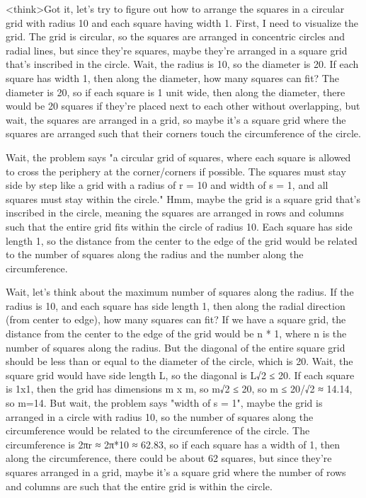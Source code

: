 <think>Got it, let's try to figure out how to arrange the squares in a circular grid with radius 10 and each square having width 1. First, I need to visualize the grid. The grid is circular, so the squares are arranged in concentric circles and radial lines, but since they're squares, maybe they're arranged in a square grid that's inscribed in the circle. Wait, the radius is 10, so the diameter is 20. If each square has width 1, then along the diameter, how many squares can fit? The diameter is 20, so if each square is 1 unit wide, then along the diameter, there would be 20 squares if they're placed next to each other without overlapping, but wait, the squares are arranged in a grid, so maybe it's a square grid where the squares are arranged such that their corners touch the circumference of the circle.

Wait, the problem says "a circular grid of squares, where each square is allowed to cross the periphery at the corner/corners if possible. The squares must stay side by step like a grid with a radius of r = 10 and width of s = 1, and all squares must stay within the circle." Hmm, maybe the grid is a square grid that's inscribed in the circle, meaning the squares are arranged in rows and columns such that the entire grid fits within the circle of radius 10. Each square has side length 1, so the distance from the center to the edge of the grid would be related to the number of squares along the radius and the number along the circumference.

Wait, let's think about the maximum number of squares along the radius. If the radius is 10, and each square has side length 1, then along the radial direction (from center to edge), how many squares can fit? If we have a square grid, the distance from the center to the edge of the grid would be n * 1, where n is the number of squares along the radius. But the diagonal of the entire square grid should be less than or equal to the diameter of the circle, which is 20. Wait, the square grid would have side length L, so the diagonal is L√2 ≤ 20. If each square is 1x1, then the grid has dimensions m x m, so m√2 ≤ 20, so m ≤ 20/√2 ≈ 14.14, so m=14. But wait, the problem says "width of s = 1", maybe the grid is arranged in a circle with radius 10, so the number of squares along the circumference would be related to the circumference of the circle. The circumference is 2πr ≈ 2π*10 ≈ 62.83, so if each square has a width of 1, then along the circumference, there could be about 62 squares, but since they're squares arranged in a grid, maybe it's a square grid where the number of rows and columns are such that the entire grid is within the circle.

